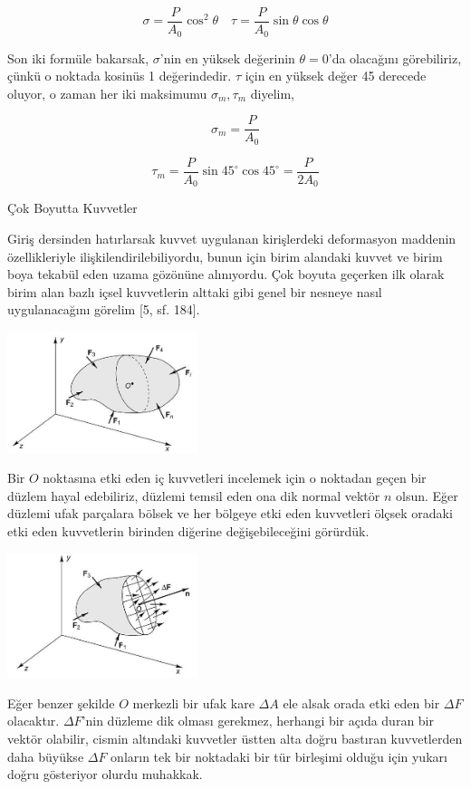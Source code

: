 \documentclass[12pt,fleqn]{article}\usepackage{../../common}
\begin{document}
$$
\sigma = \frac{P}{A_0} \cos^2 \theta \quad
\tau = \frac{P}{A_0} \sin\theta \cos\theta
$$

Son iki formüle bakarsak, $\sigma$'nin en yüksek değerinin $\theta=0$'da
olacağını görebiliriz, çünkü o noktada kosinüs 1 değerindedir. $\tau$ için
en yüksek değer 45 derecede oluyor, o zaman her iki maksimumu $\sigma_m, \tau_m$
diyelim,

$$
\sigma_m = \frac{P}{A_0}
$$

$$
\tau_m = \frac{P}{A_0} \sin 45^{\circ} \cos 45^{\circ} = \frac{P}{2 A_0}
$$

Çok Boyutta Kuvvetler

Giriş dersinden hatırlarsak kuvvet uygulanan kirişlerdeki deformasyon maddenin
özellikleriyle ilişkilendirilebiliyordu, bunun için birim alandaki kuvvet ve
birim boya tekabül eden uzama gözönüne alınıyordu. Çok boyuta geçerken ilk
olarak birim alan bazlı içsel kuvvetlerin alttaki gibi genel bir nesneye nasıl
uygulanacağını görelim [5, sf. 184].

\includegraphics[width=15em]{phy_020_strs_02_16.jpg}

Bir $O$ noktasına etki eden iç kuvvetleri incelemek için o noktadan geçen bir
düzlem hayal edebiliriz, düzlemi temsil eden ona dik normal vektör $n$ olsun.
Eğer düzlemi ufak parçalara bölsek ve her bölgeye etki eden kuvvetleri ölçsek
oradaki etki eden kuvvetlerin birinden diğerine değişebileceğini görürdük.

\includegraphics[width=15em]{phy_020_strs_02_17.jpg}

Eğer benzer şekilde $O$ merkezli bir ufak kare $\Delta A$ ele alsak orada etki
eden bir $\Delta F$ olacaktır. $\Delta F$'nin düzleme dik olması gerekmez,
herhangi bir açıda duran bir vektör olabilir, cismin altındaki kuvvetler üstten
alta doğru bastıran kuvvetlerden daha büyükse $\Delta F$ onların tek bir
noktadaki bir tür birleşimi olduğu için yukarı doğru gösteriyor olurdu muhakkak.
\end{document}
